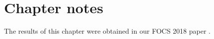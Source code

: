 \section{Chapter notes}
\label{sec:heat:notes}

The results of this chapter were obtained in our FOCS 2018 paper \cite{Saglam2018}.
